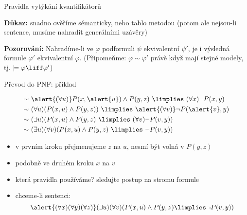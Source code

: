 \documentclass{beamer}
\begin{document}
\begin{frame}{Pravidla vytýkání kvantifikátorů}


    \textbf{Důkaz:} snadno ověříme sémanticky, nebo tablo metodou (potom ale nejsou-li sentence, musíme nahradit generálními uzávěry)\hfill\qedsymbol

    \smallskip

    \textbf{Pozorování:} Nahradíme-li ve $\varphi$ podformuli $\psi$ ekvivalentní $\psi'$, je i výsledná formule $\varphi'$ ekvivalentní $\varphi$. (Připomeňme: $\varphi\sim\varphi'$ právě když mají stejné modely, tj. $\models\varphi\liff\varphi'$)
    
\end{frame}


\begin{frame}{Převod do PNF: příklad}

    \begin{align*}
        \sim &\ 
        \alert{(\forall u)} P(x,\alert{u})\land P(y,z)\ \limplies\ (\forall x)\neg P(x,y)\\ \sim &\ 
        (\forall u)(P(x,u)\land P(y,z))\ \limplies\ \alert{(\forall v)}\neg P(\alert{v},y)\\ \sim &\ 
        (\exists u)( P(x,u)\land P(y,z)\ \limplies\ (\forall v)\neg P(v,y))\\ \sim &\ 
        (\exists u)(\forall v)( P(x,u)\land P(y,z)\ \limplies\ \neg P(v,y))
    \end{align*}
    
    \begin{itemize}
        \item v prvním kroku přejmenujeme $z$ na $u$, \alert{nesmí být volná v $P(y,z)$}
        \item podobně ve druhém kroku $x$ na $v$
        \item která pravidla používáme? sledujte postup na stromu formule
        \item chceme-li sentenci:
        $$
        \alert{(\forall x)(\forall y)(\forall z)}(\exists u)(\forall v)( P(x,u)\land P(y,z)\limplies\neg P(v,y))
        $$
    \end{itemize}

\end{frame}
\end{document}
